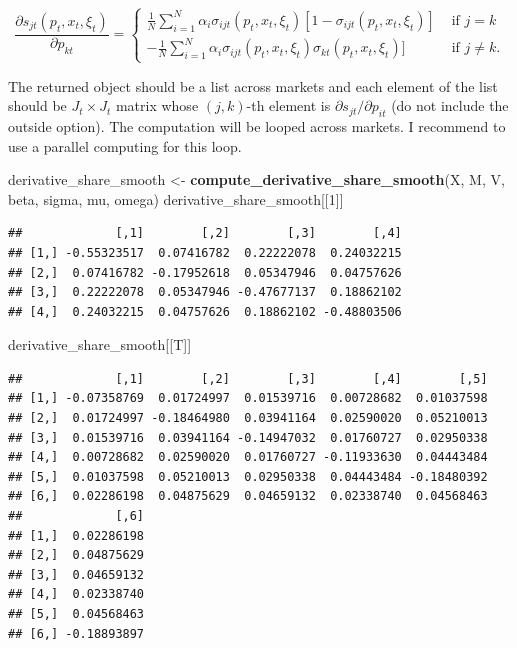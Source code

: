 \documentclass[]{book}
\newenvironment{Shaded}{\begin{snugshade}}{\end{snugshade}}
\newcommand{\KeywordTok}[1]{\textcolor[rgb]{0.13,0.29,0.53}{\textbf{#1}}}
\newcommand{\DecValTok}[1]{\textcolor[rgb]{0.00,0.00,0.81}{#1}}
\newcommand{\StringTok}[1]{\textcolor[rgb]{0.31,0.60,0.02}{#1}}
\newcommand{\NormalTok}[1]{#1}
\begin{document}
\[
\frac{\partial s_{jt}(p_t, x_t, \xi_t)}{\partial p_{kt}} = 
\begin{cases}
\frac{1}{N} \sum_{i = 1}^N \alpha_i \sigma_{ijt}(p_t, x_t, \xi_t)[1 - \sigma_{ijt}(p_t, x_t, \xi_t)] &\text{   if   } j = k\\
- \frac{1}{N}\sum_{i = 1}^N \alpha_i \sigma_{ijt}(p_t, x_t, \xi_t)\sigma_{kt}(p_t, x_t, \xi_t)] &\text{   if   } j \neq k.
\end{cases}
\]

The returned object should be a list across markets and each element of
the list should be \(J_t \times J_t\) matrix whose \((j, k)\)-th element
is \(\partial s_{jt}/\partial p_{it}\) (do not include the outside
option). The computation will be looped across markets. I recommend to
use a parallel computing for this loop.

\begin{Shaded}
\begin{Highlighting}[]
\NormalTok{derivative_share_smooth <-}
\StringTok{  }\KeywordTok{compute_derivative_share_smooth}\NormalTok{(X, M, V, beta, sigma, mu, omega)}
\NormalTok{derivative_share_smooth[[}\DecValTok{1}\NormalTok{]]}
\end{Highlighting}
\end{Shaded}

\begin{verbatim}
##             [,1]        [,2]        [,3]        [,4]
## [1,] -0.55323517  0.07416782  0.22222078  0.24032215
## [2,]  0.07416782 -0.17952618  0.05347946  0.04757626
## [3,]  0.22222078  0.05347946 -0.47677137  0.18862102
## [4,]  0.24032215  0.04757626  0.18862102 -0.48803506
\end{verbatim}

\begin{Shaded}
\begin{Highlighting}[]
\NormalTok{derivative_share_smooth[[T]]}
\end{Highlighting}
\end{Shaded}

\begin{verbatim}
##             [,1]        [,2]        [,3]        [,4]        [,5]
## [1,] -0.07358769  0.01724997  0.01539716  0.00728682  0.01037598
## [2,]  0.01724997 -0.18464980  0.03941164  0.02590020  0.05210013
## [3,]  0.01539716  0.03941164 -0.14947032  0.01760727  0.02950338
## [4,]  0.00728682  0.02590020  0.01760727 -0.11933630  0.04443484
## [5,]  0.01037598  0.05210013  0.02950338  0.04443484 -0.18480392
## [6,]  0.02286198  0.04875629  0.04659132  0.02338740  0.04568463
##             [,6]
## [1,]  0.02286198
## [2,]  0.04875629
## [3,]  0.04659132
## [4,]  0.02338740
## [5,]  0.04568463
## [6,] -0.18893897
\end{verbatim}
\end{document}
